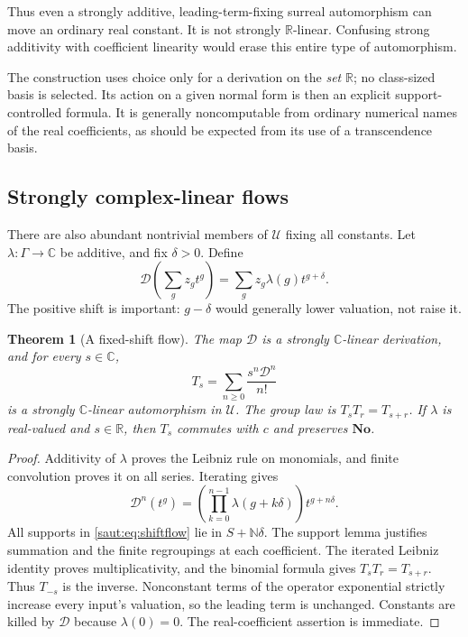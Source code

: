 \documentclass[11pt]{article}
\newtheorem{theorem}{Theorem}[section]
\theoremstyle{definition}
\theoremstyle{remark}
\newcommand{\No}{\mathbf{No}}
\newcommand{\R}{\mathbb R}
\newcommand{\C}{\mathbb C}
\newcommand{\N}{\mathbb N}
\newcommand{\U}{\mathcal U}
\numberwithin{equation}{section}
\begin{document}
Thus even a strongly additive, leading-term-fixing surreal automorphism
can move an ordinary real constant. It is not strongly $\R$-linear.
Confusing strong additivity with coefficient linearity would erase this
entire type of automorphism.

The construction uses choice only for a derivation on the \emph{set} $\R$;
no class-sized basis is selected. Its action on a given normal form is then
an explicit support-controlled formula. It is generally noncomputable from
ordinary numerical names of the real coefficients, as should be expected
from its use of a transcendence basis.

\subsection{Strongly complex-linear flows}

There are also abundant nontrivial members of $\U$ fixing all constants.
Let $\lambda:\Gamma\to\C$ be additive, and fix $\delta>0$. Define
\begin{equation}\label{saut:eq:shiftderiv}
 \mathcal D\left(\sum_g z_gt^g\right)=\sum_g z_g\lambda(g)t^{g+\delta}.
\end{equation}
The positive shift is important: $g-\delta$ would generally lower valuation,
not raise it.

\begin{theorem}[A fixed-shift flow]\label{saut:thm:shiftflow}
The map $\mathcal D$ is a strongly $\C$-linear derivation, and for every $s\in\C$,
\begin{equation}\label{saut:eq:shiftflow}
 T_s=\sum_{n\ge0}\frac{s^n\mathcal D^n}{n!}
\end{equation}
is a strongly $\C$-linear automorphism in $\U$. The group law is
$T_sT_r=T_{s+r}$. If $\lambda$ is real-valued and $s\in\R$, then $T_s$
commutes with $c$ and preserves $\No$.
\end{theorem}
\begin{proof}
Additivity of $\lambda$ proves the Leibniz rule on monomials, and finite
convolution proves it on all series. Iterating gives
\[
 \mathcal D^n(t^g)=
 \left(\prod_{k=0}^{n-1}\lambda(g+k\delta)\right)t^{g+n\delta}.
\]
All supports in \eqref{saut:eq:shiftflow} lie in $S+\N\delta$. The support lemma
justifies summation and the finite regroupings at each coefficient.
The iterated Leibniz identity proves multiplicativity, and the binomial
formula gives $T_sT_r=T_{s+r}$. Thus $T_{-s}$ is the inverse. Nonconstant
terms of the operator exponential strictly increase every input's valuation,
so the leading term is unchanged. Constants are killed by $\mathcal D$ because
$\lambda(0)=0$. The real-coefficient assertion is immediate.
\end{proof}
\end{document}
